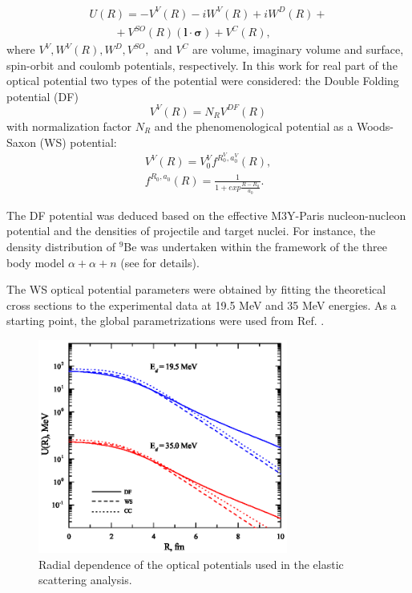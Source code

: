 \documentclass[10pt]{iopart}
\begin{document}
\begin{equation}\label{eqn:OP}
\begin{array}{l}
 U(R)=-V^{V}(R)-iW^{V}(R)+iW^D(R)+\\
~~~ ~~~~~~~+V^{SO}(R)( \mathbf{l} \cdot \mathbf{ \sigma } )+V^C(R),
\end{array}
 \end{equation}
where $V^{V}, W^{V}(R), W^D, V^{SO}, $ and $V^C$ are volume, imaginary volume and surface, spin-orbit and coulomb potentials, respectively. 
 In this work for real part of the optical potential  two types of the potential  were considered: the Double Folding potential (DF)
\begin{equation}
V^V(R) = N_R V^{DF}(R) 
\end{equation}
with normalization factor $N_R$ and the phenomenological potential as a Woods-Saxon (WS) potential:
\begin{eqnarray}
V^V(R) =  V^V_0 f^{R^V_0, a^V_0}(R), \\
 f^{R_0,a_0}(R)=\frac{1}{1+exp{\frac{R-R_0}{a_0}}}.
\end{eqnarray}

The DF potential was deduced based on the effective M3Y-Paris nucleon-nucleon potential and the densities of projectile and target nuclei. For instance, the density distribution of $^9$Be was undertaken within the framework of the three body model $\alpha+\alpha+n$ (see  \cite{urazbekov2016} for details).

The WS optical potential parameters were obtained by fitting the theoretical cross sections to the experimental data  at 19.5 MeV and 35 MeV energies. As a starting point, the global parametrizations were used from Ref. \cite{globalDeuteron}. 




\begin{figure}[tp]
\centering
\includegraphics[width=8.2cm]{POT.eps}
\caption{ \label{POT}  \footnotesize Radial dependence of the optical potentials used in the elastic scattering analysis. }
\end{figure}
\end{document}

